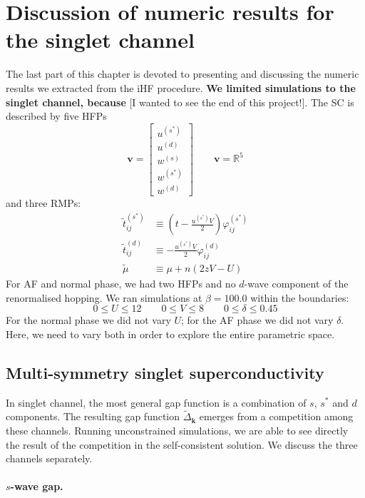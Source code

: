 \section{Discussion of numeric results for the singlet channel}\label{sec:sc-numeric}

The last part of this chapter is devoted to presenting and discussing the numeric results we extracted from the iHF procedure. {\color{tabred}\textbf{We limited simulations to the singlet channel, because} [I wanted to see the end of this project!]}. The SC is described by five HFPs
\[
	\mathbf{v} = \begin{bmatrix}
		u^{(s^*)} \\ u^{(d)} \\ w^{(s)} \\ w^{(s^*)} \\ w^{(d)}
	\end{bmatrix}
	\qquad
	\mathbf{v} = \mathbb{R}^5
\]
and three RMPs:
\[
\begin{aligned}
	\tilde{t}_{ij}^{(s^*)} &\equiv \left(
	t - \frac{u^{(s^*)}V}{2}
	\right) \varphi_{ij}^{(s^*)} \\
	\tilde{t}_{ij}^{(d)} &\equiv - \frac{u^{(s^*)}V}{2} \varphi_{ij}^{(d)} \\
	\tilde{\mu} &\equiv \mu + n (2zV-U)
\end{aligned}
\]
For AF and normal phase, we had two HFPs and no $d$-wave component of the renormalised hopping. We ran simulations at $\beta=100.0$ within the boundaries:
\[
	0 \le U \le 12
	\qquad
	0 \le V \le 8
	\qquad
	0 \le \delta \le 0.45
\]
For the normal phase we did not vary $U$; for the AF phase we did not vary $\delta$. Here, we need to vary both in order to explore the entire parametric space.

\subsection{Multi-symmetry singlet superconductivity}

In singlet channel, the most general gap function is a combination of $s$, $s^*$ and $d$ components. The resulting gap function $\tilde{\Delta}_{\mathbf{k}}$ emerges from a competition among these channels. Running unconstrained simulations, we are able to see directly the result of the competition in the self-consistent solution. We discuss the three channels separately.

\paragraph{$s$-wave gap.}

